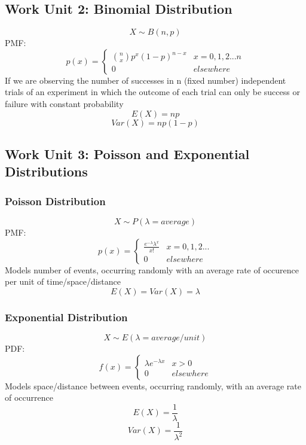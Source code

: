 \documentclass[a4paper,10pt]{article}
\begin{document}
\subsection{Work Unit 2: Binomial Distribution}
\[
	X \sim B(n,p)
\]
PMF:
\[
	p(x) =\left\{ \begin{array} {lr} \binom{n}{x}p^x(1-p)^{n-x} & x = 0,1,2...n \\ 0 & elsewhere \end{array}
\]
If we are observing the number of successes in n (fixed number) independent trials of an experiment in which the outcome of each trial can only be success or failure with constant probability
\\
\[
	E(X) = np
\]
\[
	Var(X) = np(1-p)
\]
\subsection{Work Unit 3: Poisson and Exponential Distributions}
\subsubsection{Poisson Distribution}
\[
	X\sim P(\lambda = average)
\]
PMF:
\[
	p(x) =\left\{ \begin{array} {lr} \frac{e^{-\lambda}\lambda^x}{x!} & x = 0,1,2... \\ 0 & elsewhere \end{array}
\]
Models number of events, occurring randomly with an average rate of occurence per unit of time/space/distance
\[
	E(X) = Var(X) = \lambda
\] 

\subsubsection{Exponential Distribution}
\[
	X\sim E(\lambda = average/unit)
\]
PDF:
\[
	f(x) =\left\{ \begin{array} {lr} \lambda e^{-\lambda x}  & x >0 \\ 0 & elsewhere \end{array}
\]
Models space/distance between events, occurring randomly, with an average rate of occurrence
\[
	E(X) = \frac{1}{\lambda}
\] 
\[
	Var(X) = \frac{1}{\lambda^2}
\]
\end{document}
